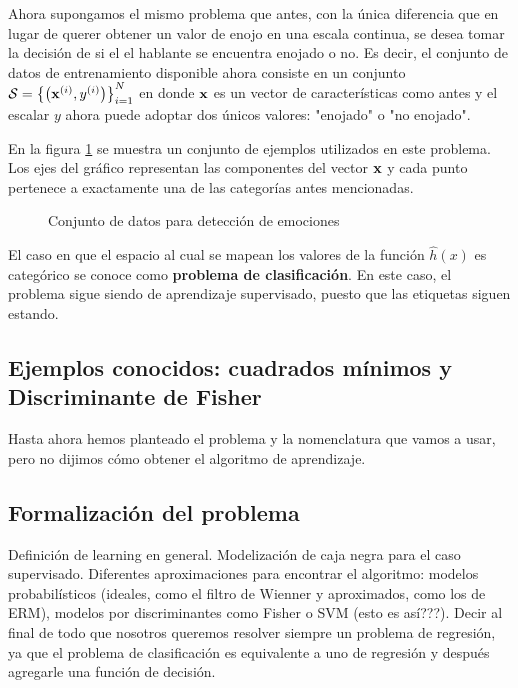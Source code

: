 Ahora supongamos el mismo problema que antes, con la única diferencia que en lugar de querer obtener un valor de enojo en una escala continua, se desea tomar la decisión de si el el hablante se encuentra enojado o no. Es decir, el conjunto de datos de entrenamiento disponible ahora consiste en un conjunto $\mathcal{S} = {\left\lbrace \left( {\mathbf{x}}^{(i)},{y}^{(i)} \right) \right\rbrace}_{i=1}^N$ en donde $\mathbf{x}$ es un vector de características como antes y el escalar $y$ ahora puede adoptar dos únicos valores: "enojado" o "no enojado". 

En la figura \ref{fig:emotion detection dataset classification} se muestra un conjunto de ejemplos utilizados en este problema. Los ejes del gráfico representan las componentes del vector $\mathbf{x}$ y cada punto pertenece a exactamente una de las categorías antes mencionadas. 

\begin{figure}[h]
\centering
\caption{Conjunto de datos para detección de emociones}
\label{fig:emotion detection dataset classification}
\end{figure}

El caso en que el espacio al cual se mapean los valores de la función $\hat{h}(x)$ es categórico se conoce como \textbf{problema de clasificación}. En este caso, el problema sigue siendo de aprendizaje supervisado, puesto que las etiquetas siguen estando. 

\subsection{Ejemplos conocidos: cuadrados mínimos y Discriminante de Fisher}

Hasta ahora hemos planteado el problema y la nomenclatura que vamos a usar, pero no dijimos cómo obtener el algoritmo de aprendizaje. 

\subsection{Formalización del problema}

Definición de learning en general. Modelización de caja negra para el caso supervisado. Diferentes aproximaciones para encontrar el algoritmo: modelos probabilísticos (ideales, como el filtro de Wienner y aproximados, como los de ERM), modelos por discriminantes como Fisher o SVM (esto es así???). Decir al final de todo que nosotros queremos resolver siempre un problema de regresión, ya que el problema de clasificación es equivalente a uno de regresión y después agregarle una función de decisión. 




